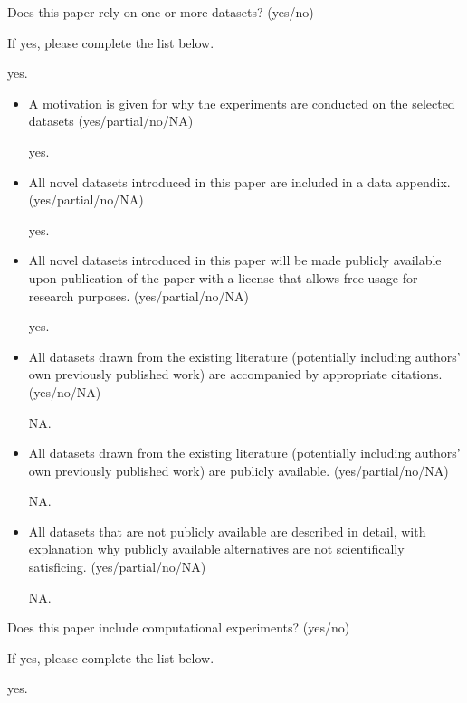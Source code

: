 \noindent Does this paper rely on one or more datasets? (yes/no)

\noindent If yes, please complete the list below.

yes.

\begin{itemize}
\item A motivation is given for why the experiments are conducted on the selected datasets (yes/partial/no/NA)

yes.

\item All novel datasets introduced in this paper are included in a data appendix. (yes/partial/no/NA)

yes.

\item All novel datasets introduced in this paper will be made publicly available upon publication of the paper with a license that allows free usage for research purposes. (yes/partial/no/NA)

yes.

\item All datasets drawn from the existing literature (potentially including authors’ own previously published work) are accompanied by appropriate citations. (yes/no/NA)

NA.

\item All datasets drawn from the existing literature (potentially including authors’ own previously published work) are publicly available. (yes/partial/no/NA)

NA.

\item All datasets that are not publicly available are described in detail, with explanation why publicly available alternatives are not scientifically satisficing. (yes/partial/no/NA)

NA.

\end{itemize}

\noindent Does this paper include computational experiments? (yes/no)

\noindent If yes, please complete the list below.

yes.

